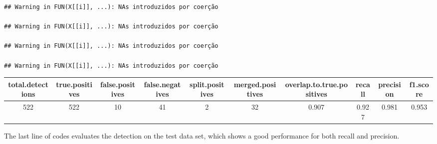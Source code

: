 \documentclass[
]{article}
\newenvironment{Shaded}{\begin{snugshade}}{\end{snugshade}}
\newcommand{\AttributeTok}[1]{\textcolor[rgb]{0.77,0.63,0.00}{#1}}
\newcommand{\CommentTok}[1]{\textcolor[rgb]{0.56,0.35,0.01}{\textit{#1}}}
\newcommand{\DecValTok}[1]{\textcolor[rgb]{0.00,0.00,0.81}{#1}}
\newcommand{\FloatTok}[1]{\textcolor[rgb]{0.00,0.00,0.81}{#1}}
\newcommand{\FunctionTok}[1]{\textcolor[rgb]{0.00,0.00,0.00}{#1}}
\newcommand{\NormalTok}[1]{#1}
\newcommand{\OtherTok}[1]{\textcolor[rgb]{0.56,0.35,0.01}{#1}}
\newcommand{\SpecialCharTok}[1]{\textcolor[rgb]{0.00,0.00,0.00}{#1}}
\newcommand{\StringTok}[1]{\textcolor[rgb]{0.31,0.60,0.02}{#1}}
\begin{document}
\begin{Shaded}
\end{Shaded}

\begin{verbatim}
## Warning in FUN(X[[i]], ...): NAs introduzidos por coerção

## Warning in FUN(X[[i]], ...): NAs introduzidos por coerção

## Warning in FUN(X[[i]], ...): NAs introduzidos por coerção

## Warning in FUN(X[[i]], ...): NAs introduzidos por coerção
\end{verbatim}

\begin{table}
\centering
\begin{tabular}[t]{c|c|c|c|c|c|c|c|c|c}
\hline
total.detections & true.positives & false.positives & false.negatives & split.positives & merged.positives & overlap.to.true.positives & recall & precision & f1.score\\
\hline
522 & 522 & 10 & 41 & 2 & 32 & 0.907 & 0.927 & 0.981 & 0.953\\
\hline
\end{tabular}
\end{table}

The last line of codes evaluates the detection on the test data set,
which shows a good performance for both recall and precision.
\end{document}
